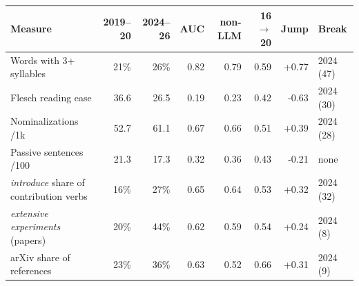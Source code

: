 \begin{tabular}{l rr rrr r l}
\toprule
Measure & 2019--20 & 2024--26 & AUC & non-LLM & 16$\to$20 & Jump & Break \\
\midrule
Words with 3+ syllables & 21\% & 26\% & 0.82 & 0.79 & 0.59 & +0.77 & 2024 (47) \\
Flesch reading ease & 36.6 & 26.5 & 0.19 & 0.23 & 0.42 & -0.63 & 2024 (30) \\
Nominalizations /1k & 52.7 & 61.1 & 0.67 & 0.66 & 0.51 & +0.39 & 2024 (28) \\
Passive sentences /100 & 21.3 & 17.3 & 0.32 & 0.36 & 0.43 & -0.21 & none \\
\textit{introduce} share of contribution verbs & 16\% & 27\% & 0.65 & 0.64 & 0.53 & +0.32 & 2024 (32) \\
\textit{extensive experiments} (papers) & 20\% & 44\% & 0.62 & 0.59 & 0.54 & +0.24 & 2024 (8) \\
arXiv share of references & 23\% & 36\% & 0.63 & 0.52 & 0.66 & +0.31 & 2024 (9) \\
\bottomrule
\end{tabular}
